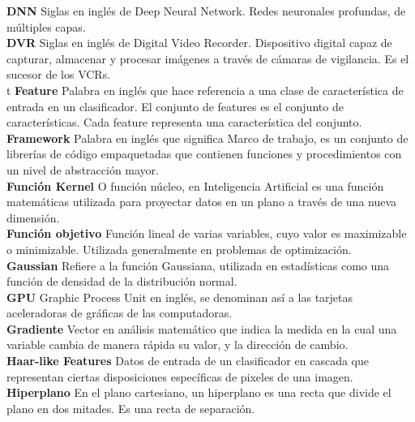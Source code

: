 \documentclass[a4paper,12pt,oneside,spanish]{book}
\begin{document}
\textbf{DNN} Siglas en inglés de Deep Neural Network. Redes neuronales profundas, de múltiples capas.\\
 
\textbf{DVR} Siglas en inglés de Digital Video Recorder. Dispositivo digital capaz de capturar, almacenar y procesar imágenes a través de cámaras de vigilancia. Es el sucesor de los VCRs.\\
 t
\textbf{Feature} Palabra en inglés que hace referencia a una clase de característica de entrada en un clasificador. El conjunto de features es el conjunto de características. Cada feature representa una característica del conjunto.\\
 
\textbf{Framework} Palabra en inglés que significa Marco de trabajo, es un conjunto de librerías de código empaquetadas que contienen funciones y procedimientos con un nivel de abstracción mayor.\\
 
\textbf{Función Kernel} O función núcleo, en Inteligencia Artificial es una función matemáticas utilizada para proyectar datos en un plano a través de una nueva dimensión.\\
 
\textbf{Función objetivo} Función lineal de varias variables, cuyo valor es maximizable o minimizable.  Utilizada generalmente en problemas de optimización.\\
 
\textbf{Gaussian} Refiere a la función Gaussiana, utilizada en estadísticas como una función de densidad de la distribución normal.\\
 
\textbf{GPU} Graphic Process Unit en inglés, se denominan así a las tarjetas aceleradoras de gráficas de las computadoras.\\
 
\textbf{Gradiente} Vector en análisis matemático que indica la medida en la cual una variable cambia de manera rápida su valor, y la dirección de cambio.\\
 
\textbf{Haar-like Features} Datos de entrada de un clasificador en cascada que representan ciertas disposiciones específicas de pixeles de una imagen.\\
 
\textbf{Hiperplano} En el  plano cartesiano, un hiperplano es una recta que divide el plano en dos mitades. Es una recta de separación.\\
 
\end{document}
